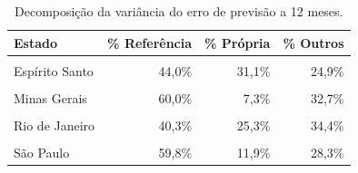 \begin{table}[!h]
\centering
\caption{\label{tab:fevd}Decomposição da variância do erro de previsão a 12 meses.}
\centering
\fontsize{10}{12}\selectfont
\begin{tabular}[t]{lrrr}
\toprule
\textbf{Estado} & \textbf{\% Referência} & \textbf{\% Própria} & \textbf{\% Outros}\\
\midrule
\cellcolor{gray!10}{Bahia} & \cellcolor{gray!10}{37,7\%} & \cellcolor{gray!10}{32,2\%} & \cellcolor{gray!10}{30,0\%}\\
Espírito Santo & 44,0\% & 31,1\% & 24,9\%\\
\cellcolor{gray!10}{Goiás} & \cellcolor{gray!10}{58,8\%} & \cellcolor{gray!10}{9,8\%} & \cellcolor{gray!10}{31,4\%}\\
Minas Gerais & 60,0\% & 7,3\% & 32,7\%\\
\cellcolor{gray!10}{Paraná} & \cellcolor{gray!10}{65,7\%} & \cellcolor{gray!10}{8,0\%} & \cellcolor{gray!10}{26,2\%}\\
Rio de Janeiro & 40,3\% & 25,3\% & 34,4\%\\
\cellcolor{gray!10}{Santa Catarina} & \cellcolor{gray!10}{61,4\%} & \cellcolor{gray!10}{6,0\%} & \cellcolor{gray!10}{32,6\%}\\
São Paulo & 59,8\% & 11,9\% & 28,3\%\\
\bottomrule
\end{tabular}
\end{table}
